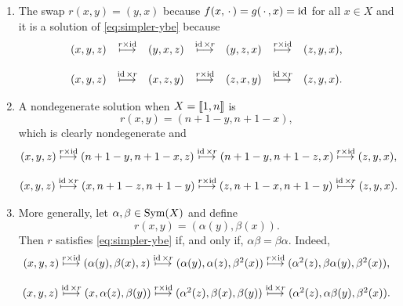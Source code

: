 \begin{xmpls}${}$
    \begin{enumerate}[\rm a)]
        \item The swap $r(x,y)=(y,x)$ because $f(x,\,\cdot\,)=g(\,\cdot\,,x)=\operatorname{id}$ for all $x\in X$ and it is a solution of \eqref{eq:simpler-ybe} because
    $$
    \begin{matrix}
        (x,y,z)&\stackrel{r\times\operatorname{id}}\longmapsto&(y,x,z)
            &\stackrel{\operatorname{id}\times r}\longmapsto&(y,z,x)
            &\stackrel{r\times\operatorname{id}}\longmapsto&(z,y,x),\\\\
        (x,y,z)&\stackrel{\operatorname{id}\times r}\longmapsto&(x,z,y)
            &\stackrel{r\times\operatorname{id}}\longmapsto&(z,x,y)
            &\stackrel{\operatorname{id}\times r}\longmapsto&(z,y,x).        
    \end{matrix}
    $$

    \item A nondegenerate solution when $X=\llbracket1,n\rrbracket$ is
    $$
        r(x,y)=(n+1-y, n+1-x),
    $$
    which is clearly nondegenerate and
    {\small
    $$
        \begin{matrix}
        (x,y,z)\stackrel{r\times\operatorname{id}}\longmapsto(n+1-y,n+1-x,z)
            \stackrel{\operatorname{id}\times r}\longmapsto(n+1-y,n+1-z,x)
            \stackrel{r\times\operatorname{id}}\longmapsto(z,y,x),\\\\
        (x,y,z)\stackrel{\operatorname{id}\times r}\longmapsto(x,n+1-z,n+1-y)
            \stackrel{r\times\operatorname{id}}\longmapsto(z,n+1-x,n+1-y)
            \stackrel{\operatorname{id}\times r}\longmapsto(z,y,x).
        \end{matrix}
    $$
    }

    \item More generally, let $\alpha,\beta\in{\rm Sym}(X)$ and define
    $$
        r(x,y) = (\alpha(y),\beta(x)).
    $$
    Then $r$ satisfies \eqref{eq:simpler-ybe} if, and only if, $\alpha\beta=\beta\alpha$. Indeed,
    {\small
    $$
        \begin{matrix}
        (x,y,z)\stackrel{r\times\operatorname{id}}
            \longmapsto(\alpha(y),\beta(x),z)
            \stackrel{\operatorname{id}\times r}
            \longmapsto(\alpha(y),\alpha(z),\beta^2(x))
            \stackrel{r\times\operatorname{id}}
            \longmapsto(\alpha^2(z),\beta\alpha(y),\beta^2(x)),\\\\
        (x,y,z)\stackrel{\operatorname{id}\times r}
            \longmapsto(x,\alpha(z),\beta(y))
            \stackrel{r\times\operatorname{id}}
            \longmapsto(\alpha^2(z),\beta(x),\beta(y))
            \stackrel{\operatorname{id}\times r}
            \longmapsto(\alpha^2(z),\alpha\beta(y),\beta^2(x)).
        \end{matrix}
    $$}
    \end{enumerate}
\end{xmpls}


